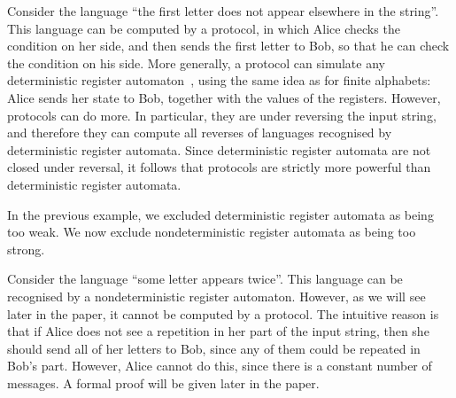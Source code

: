 \begin{myexample}\label{ex:last-letter-does-not-appear-before} Consider the language ``the first letter does not appear elsewhere in the string''. This language can be computed by a protocol, in which Alice checks the condition on her side, and then sends the first letter to Bob, so that he can check the condition on his side. More generally, a protocol can simulate any  deterministic register automaton~\cite[Definition 3]{kaminskiFiniteMemoryAutomata1994}, using the same idea as for  finite alphabets: Alice  sends her state  to Bob, together with the values of the registers.  However,  protocols can do more. In particular, they are under reversing the input string, and therefore they can compute all reverses of languages recognised by deterministic register automata. Since deterministic register automata are not closed under reversal, it follows  that protocols are strictly more powerful than deterministic register automata. 
\end{myexample}

In the previous example, we  excluded deterministic register automata as being too weak. We now exclude nondeterministic register automata as being too strong. 

\begin{myexample}
    \label{ex:some-twice}
    Consider the language ``some letter appears twice''. This language can be recognised by a nondeterministic register automaton. However, as we will see later in the paper, it cannot be computed by a protocol. The  intuitive reason  is that if Alice does not see a repetition in her part of the input string, then she should send all of her letters to Bob, since any of them could be repeated in Bob's part. However, Alice cannot do this, since there is a constant number of messages. A formal proof will be given later in the paper.
\end{myexample}

